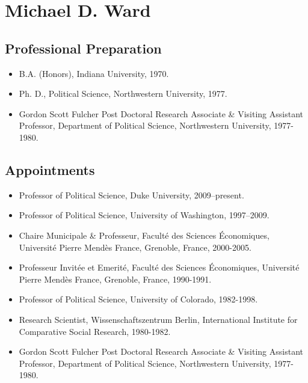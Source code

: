 \documentclass[pdftex,12pt,fullpage,oneside]{amsart}
\begin{document}
\newpage
\setcounter{page}{1}

 


\newpage
\setcounter{page}{1}


\section*{Michael D. Ward}
\subsection*{Professional Preparation}
\begin{itemize}
\item[]B.A. (Honors), Indiana University, 1970. 
\item[]Ph. D., Political Science, Northwestern University, 1977.
\item[]Gordon Scott Fulcher Post Doctoral Research Associate \&
  Visiting Assistant Professor, Department of Political Science,
  Northwestern University, 1977-1980.
\end{itemize}
\subsection*{Appointments}
\begin{itemize}
\item[] Professor of Political Science, Duke University, 2009--present.
\item[] Professor of Political Science, University of Washington, 1997--2009.
\item[] Chaire Municipale \& Professeur, Facult\'{e} des Sciences
  \'{E}conomiques, Universit\'{e} Pierre Mend\`{e}s France, Grenoble,
  France, 2000-2005.
\item[] Professeur Invit\'{e}e et Emerit\'{e}, Facult\'{e} des
  Sciences \'{E}conomiques, Universit\'{e} Pierre Mend\`{e}s France,
  Grenoble, France, 1990-1991.
\item[] Professor of Political Science, University of Colorado, 1982-1998.
\item[] Research Scientist, Wissenschaftszentrum Berlin, International
  Institute for Comparative Social Research, 1980-1982.

\item[] Gordon Scott Fulcher Post Doctoral Research Associate \&
  Visiting Assistant Professor, Department of Political Science,
  Northwestern University, 1977-1980.
\end{itemize}
\end{document}
